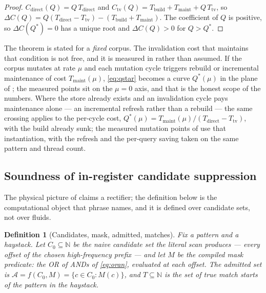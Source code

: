 \documentclass[11pt,letterpaper]{article}
\newtheorem{definition}{Definition}
\begin{document}
\begin{proof}
$C_{\text{direct}}(Q)=Q\,T_{\text{direct}}$ and
$C_{\text{tv}}(Q)=T_{\text{build}}+T_{\text{maint}}+Q\,T_{\text{tv}}$, so
$\Delta C(Q)=Q(T_{\text{direct}}-T_{\text{tv}})-(T_{\text{build}}
+T_{\text{maint}})$. The coefficient of $Q$ is positive, so
$\Delta C(Q^{*})=0$ has a unique root and $\Delta C(Q)>0$ for $Q>Q^{*}$.
\end{proof}

The theorem is stated for a \emph{fixed} corpus. The invalidation cost that
maintains that condition is not free, and it is measured in
 rather than assumed. If the corpus mutates at rate $\mu$
and each mutation cycle triggers rebuild or incremental maintenance of cost
$T_{\text{maint}}(\mu)$, \eqref{eq:qstar} becomes a curve
$Q^{*}(\mu)$ in the plane of ; the measured points sit on
the $\mu=0$ axis, and that is the honest scope of the numbers. Where the
store already exists and an invalidation cycle pays maintenance alone ---
an incremental refresh rather than a rebuild --- the same crossing applies
to the per-cycle cost,
$Q^{*}(\mu) = T_{\text{maint}}(\mu)/(T_{\text{direct}}-T_{\text{tv}})$,
with the build already sunk; the measured mutation points of
 use that instantiation, with the refresh and the per-query
saving taken on the same pattern and thread count.

\subsection{Soundness of in-register candidate suppression}
\label{sec:foundations:abs}
The physical picture of  claims a rectifier; the definition
below is the computational object that phrase names, and it is defined over
candidate sets, not over fluids.

\begin{definition}[Candidates, mask, admitted, matches]
\label{def:candidates}
Fix a pattern and a haystack. Let $C_0\subseteq\mathbb{N}$ be the naive
candidate set the literal scan produces --- every offset of the chosen
high-frequency prefix --- and let $M$ be the compiled mask predicate: the
OR of ANDs of \eqref{eq:oran}, evaluated at each offset. The admitted set
is $\mathcal{A}=f(C_0,M)=\{c\in C_0 : M(c)\}$, and $T\subseteq\mathbb{N}$
is the set of true match starts of the pattern in the haystack.
\end{definition}
\end{document}
